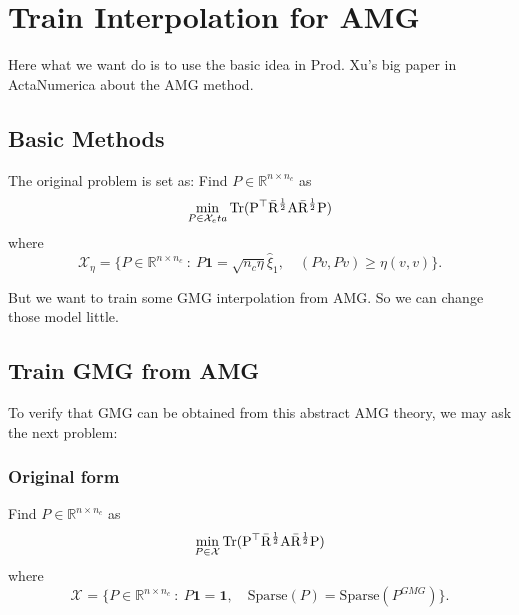 \newpage
\section{Train Interpolation for AMG}
Here what we want do is to use the basic idea in Prod. Xu's big paper in ActaNumerica about the AMG method. 


\subsection{Basic Methods}
The original problem is set as: 
	Find $P \in \mathbb{R}^{n\times n_c}$ as 
	\begin{equation}\label{min-tra}
	\min_{P \in \mathcal{X}_eta} \rm{Tr} (P^\top \bar{R}^{\frac{1}{2}} A \bar R^{\frac{1}{2}} P)
	\end{equation}
	where 
	\begin{equation}\label{min-con}
	\mathcal{X}_{\eta} = \{P \in \mathbb{R}^{n\times n_c} ~:~ P \bm{1} =  \sqrt{n_c\eta}\hat \xi_1, \quad (Pv, Pv) \ge \eta (v,v) \}.
	\end{equation}

But we want to train some GMG interpolation from AMG. So we can change those model little.
\subsection{Train GMG from AMG}
To verify that GMG can be obtained from this abstract AMG theory, we may ask the next problem:
\subsubsection{Original form}
	Find $P \in \mathbb{R}^{n\times n_c}$ as 
	\begin{equation}\label{min-tra}
	\min_{P \in \mathcal{X}} \rm{Tr} (P^\top \bar{R}^{\frac{1}{2}} A \bar R^{\frac{1}{2}} P)
	\end{equation}
	where 
	\begin{equation}\label{min-con}
	\mathcal{X}_{} = \{P \in \mathbb{R}^{n\times n_c} ~:~ P \bm{1} =  \bm{1}, \quad \text{Sparse}(P) = \text{Sparse}(P^{GMG}) \}.
	\end{equation}
